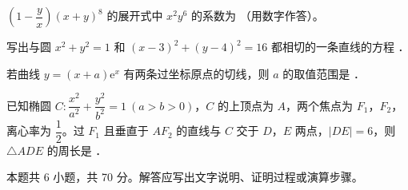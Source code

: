 \begin{question}
$\left(1-\dfrac yx\right)(x+y)^{8}$ 的展开式中 $x^{2}y^{6}$ 的系数为 \gkblank{}（用数字作答）。

\end{question}
\begin{question}
写出与圆 $x^{2}+y^{2}=1$ 和 $(x-3)^{2}+(y-4)^{2}=16$ 都相切的一条直线的方程 \gkblank{}．

\end{question}
\begin{question}
若曲线 $y=(x+a)\mathrm e^{x}$ 有两条过坐标原点的切线，则 $a$ 的取值范围是 \gkblank{}．

\end{question}
\begin{question}
已知椭圆 $C:\dfrac{x^{2}}{a^{2}}+\dfrac{y^{2}}{b^{2}}=1\ (a>b>0)$，$C$ 的上顶点为 $A$，两个焦点为 $F_1$，$F_2$，离心率为 $\dfrac12$。过 $F_1$ 且垂直于 $AF_2$ 的直线与 $C$ 交于 $D$，$E$ 两点，$|DE|=6$，则 $\triangle ADE$ 的周长是 \gkblank{}．

\par\medskip

\end{question}

\begin{gktip}
本题共 6 小题，共 70 分。解答应写出文字说明、证明过程或演算步骤。
\end{gktip}

